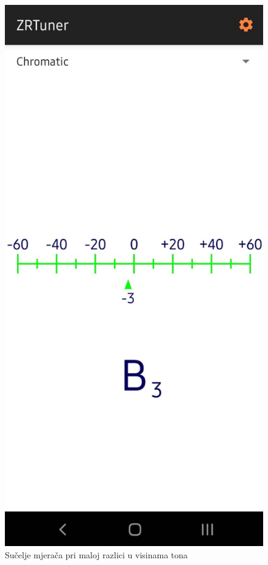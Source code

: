 \documentclass[times, utf8, zavrsni, numeric]{fer}
\begin{document}
\begin{figure}
	\centerline{\includegraphics[height=0.9\textheight]{zrtuner_gauge_green.jpeg}}
	\caption{Sučelje mjerača pri maloj razlici u visinama tona}
	\label{fig}
\end{figure}
\end{document}

